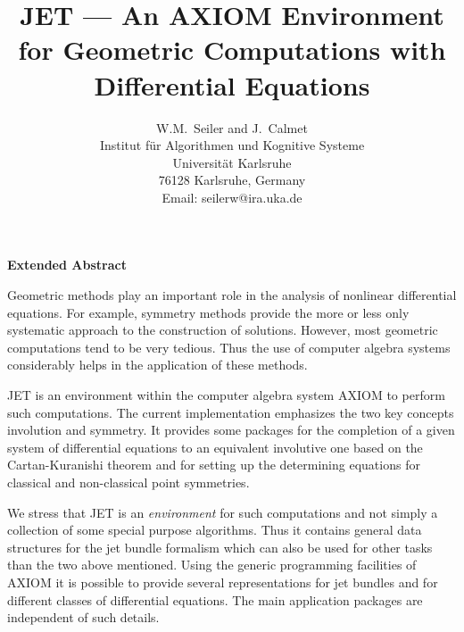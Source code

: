
\setlength{\headheight}{0.5cm}
\setlength{\headsep}{0.3cm}
\setlength{\textheight}{23.5cm}
\setlength{\textwidth}{15cm}



\title{JET --- An AXIOM Environment for Geometric Computations with
Differential Equations}
\author{W.M.~Seiler and J.~Calmet\\
        Institut f\"ur Algorithmen und Kognitive Systeme\\
        Universit\"at Karlsruhe\\
        76128 Karlsruhe, Germany\\
        Email: seilerw@ira.uka.de}
\date{}
\maketitle

\begin{center}
\Large\bf Extended Abstract
\end{center}

Geometric methods play an important role in the analysis of nonlinear
differential equations. For example, symmetry methods provide the more or less
only systematic approach to the construction of solutions. However, most
geometric computations tend to be very tedious. Thus the use of computer algebra
systems considerably helps in the application of these methods.

{\small JET} is an environment within the computer algebra system {\small AXIOM}
to perform such computations. The current implementation emphasizes the two key
concepts involution and symmetry. It provides some packages for the completion
of a given system of differential equations to an equivalent involutive one
based on the Cartan-Kuranishi theorem and for setting up the determining
equations for classical and non-classical point symmetries.

We stress that {\small JET} is an {\em environment\/} for such computations and
not simply a collection of some special purpose algorithms. Thus it contains
general data structures for the jet bundle formalism which can also be used for
other tasks than the two above mentioned. Using the generic programming
facilities of {\small AXIOM} it is possible to provide several representations
for jet bundles and for different classes of differential equations. The main
application packages are independent of such details.

